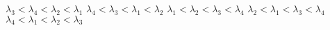 \documentclass[11pt]{exam}
\begin{document}
\begin{questions}
\begin{choices}
	\choice \( \lambda_3 < \lambda_4 < \lambda_2 < \lambda_1 \)
	\choice \( \lambda_4 < \lambda_3 < \lambda_1 < \lambda_2 \)
	\choice \( \lambda_1 < \lambda_2 < \lambda_3 < \lambda_4 \)
	\choice \( \lambda_2 < \lambda_1 < \lambda_3 < \lambda_4 \)
	\choice \( \lambda_4 < \lambda_1 < \lambda_2 < \lambda_3 \)
\end{choices}

\vspace{3mm}\end{questions}
\end{document}
